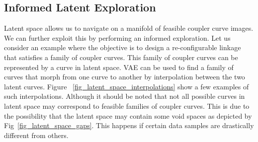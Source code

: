 \subsection{Informed Latent Exploration}
Latent space allows us to navigate on a manifold of feasible coupler curve images. We can further exploit this by performing an informed exploration. Let us consider an example where the objective is to design a re-configurable linkage that satisfies a family of coupler curves. This family of coupler curves can be represented by a curve in latent space. VAE can be used to find a family of curves that morph from one curve to another by interpolation between the two latent curves. Figure ~\ref{fig_latent_space_interpolations} show a few examples of such interpolations.  
Although it should be noted that not all possible curves in latent space may correspond to feasible families of coupler curves. This is due to the possibility that the latent space may contain some void spaces as depicted by Fig~\ref{fig_latent_space_gaps}. This happens if certain data samples are drastically different from others.

